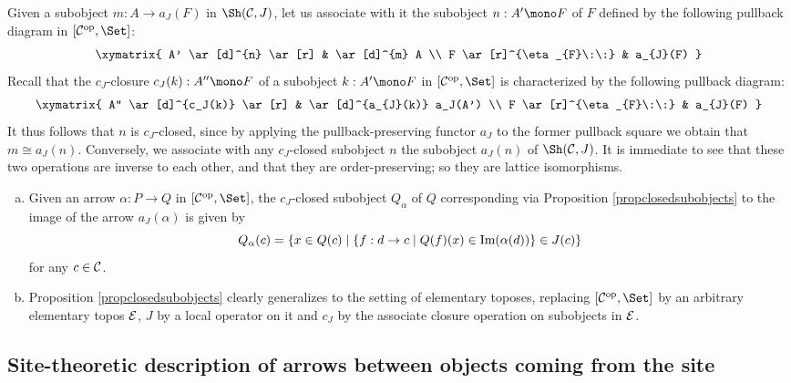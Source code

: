 \documentclass[a4paper,12pt]{article}
\begin{document}
\begin{proofs}
	Given a subobject $m:A\to a_{J}(F)$ in $\Sh({\cal C}, J)$, let us associate with it the subobject $n:A'\mono F$ of $F$ defined by the following pullback diagram in $[{\cal C}^{\textup{op}}, \Set]$:
	$$
	\xymatrix{
		A' \ar[d]^{n} \ar[r] & \ar[d]^{m} A  \\
		F \ar[r]^{\eta_{F}\:\:}  & a_{J}(F)
	}
	$$
	Recall that the $c_{J}$-closure $c_{J}(k):A''\mono F$ of a subobject $k:A'\mono F$ in $[{\cal C}^{\textup{op}}, \Set]$ is characterized by the following pullback diagram:
	$$
	\xymatrix{
		A'' \ar[d]^{c_J(k)} \ar[r] & \ar[d]^{a_{J}(k)} a_J(A')  \\
		F \ar[r]^{\eta_{F}\:\:}  & a_{J}(F)
	}
	$$ 
	It thus follows that $n$ is $c_J$-closed, since by applying the pullback-preserving functor $a_J$ to the former pullback square we obtain that $m\cong a_J(n)$.
	Conversely, we associate with any $c_J$-closed subobject $n$ the subobject $a_J(n)$ of $\Sh({\cal C}, J)$. It is immediate to see that these two operations are inverse to each other, and that they are order-preserving; so they are lattice isomorphisms.
\end{proofs}

\begin{remarks}\label{remimageclosedsubobject}
	\begin{enumerate}[(a)]
		\item Given an arrow $\alpha:P\to Q$ in $[{\cal C}^{\textup{op}}, \Set]$, the $c_J$-closed subobject $Q_{\alpha}$ of $Q$ corresponding via Proposition \ref{propclosedsubobjects} to the image of the arrow $a_{J}(\alpha)$ is given by $$Q_{\alpha}(c)=\{x\in Q(c) \mid \{f:d\to c \mid Q(f)(x)\in \textup{Im}(\alpha(d))\}\in J(c) \}$$
		for any $c\in {\cal C}$.
		
		\item Proposition \ref{propclosedsubobjects} clearly generalizes to the setting of elementary toposes, replacing $[{\cal C}^{\textup{op}}, \Set]$ by an arbitrary elementary topos $\cal E$, $J$ by a local operator on it and $c_{J}$ by the associate closure operation on subobjects in $\cal E$.
	\end{enumerate}
	
\end{remarks}

  

\subsection{Site-theoretic description of arrows between objects coming from the site}\label{sec:arrowscomingfromthesite}
\end{document}
